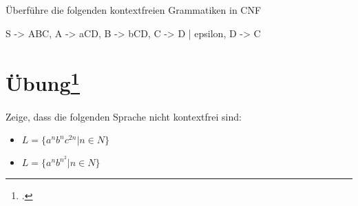 \documentclass{lehramt-informatik-aufgabe}
\begin{document}
Überführe die folgenden kontextfreien Grammatiken in CNF

\begin{liProduktionsRegeln}
S -> ABC,
A -> aCD,
B -> bCD,
C -> D | epsilon,
D -> C
\end{liProduktionsRegeln}

%

\section{Übung\footcite[Seite 43]{theo:fs:2}}

Zeige, dass die folgenden Sprache nicht kontextfrei sind:

\begin{itemize}
\item $L = \{ a^n b^n c^{2n} | n \in N \}$
\item $L = \{ a^n b^{n^2} | n \in N \}$
\end{itemize}
\end{document}
